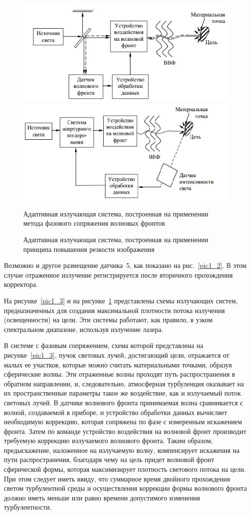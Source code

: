 \documentclass[pscyr,titlepage]{hedreport}
\newcommand{\pic}[1]{\ref{pic#1}}
\begin{document}
\begin{figure}[ht]
  \center
  \includegraphics[width=.47\textwidth]{sl_1_3} \hfill
  \includegraphics[width=.47\textwidth]{sl_1_4} \\
  \parbox{.47\textwidth}{ \caption{Адаптивная излучающая система, построенная
    на применении метода фазового сопряжения волновых фронтов}
    \label{pic1_3} } \hfill
  \parbox{.47\textwidth}{ \caption{Адаптивная излучающая система, построенная
    на применении принципа повышения резкости изображения}
    \label{pic1_4} }
\end{figure}

Возможно и другое размещение датчика~5, как показано на рис.~\pic{1_2}. В
этом случае отраженное излучение регистрируется после вторичного прохождения
корректора.
 
На рисунке~\pic{1_3} и на рисунке~\pic{1_4} представлены схемы излучающих
систем, предназначенных для создания максимальной плотности потока излучения
(освещенности) на цели. Эти системы работают, как правило, в узком спектральном
диапазоне, используя излучение лазера.

В системе с фазовым сопряжением, схема которой представлена на
рисунке~\pic{1_3}, пучок световых лучей, достигающий цели, отражается от малых
ее участков, которые можно считать материальными точками, образуя сферические
волны. Эти отраженные волны проходят путь распространения в обратном
направлении, и, следовательно, атмосферная турбуленция оказывает на их
пространственные параметры такое же воздействие, как и излучаемый поток световых
лучей. В датчике волнового фронта принимаемая волна сравнивается с волной,
создаваемой в приборе, и устройство обработки данных вычисляет необходимую
коррекцию, которая сопряжена по фазе с измеренным искажением фронта. Затем по
команде устройство  воздействия  на волновой фронт производит требуемую
коррекцию излучаемого волнового фронта. Таким образом, предыскажение, наложенное
на излучаемую волну, компенсирует искажения на пути распространения, благодаря
чему на цель придет волновой фронт сферической формы, которая максимизирует
плотность светового потока на цели. При этом следует иметь ввиду, что суммарное
время двойного прохождения светом турбулентной среды и осуществления коррекции
формы волнового фронта должно иметь меньше или равно времени допустимого
изменения турбулентности.
\end{document}
